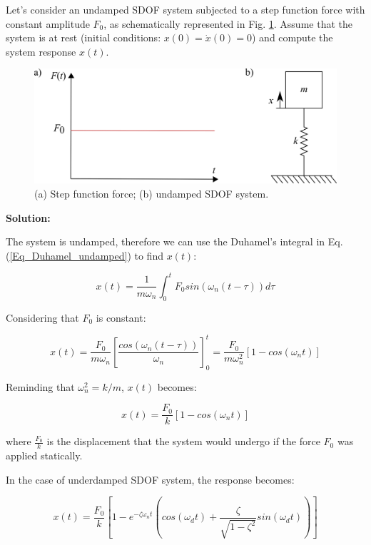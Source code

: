 \documentclass[12pt,letter]{article}
\begin{document}
\begin{example}
	
	Let's consider an undamped SDOF system subjected to a step function force with constant amplitude $F_0$, as schematically represented in Fig. \ref{fig:step_force}. Assume that the system is at rest (initial conditions: $x(0) = \dot{x}(0) = 0$) and compute the system response $x(t)$. 
	
	\begin{figure}[H]
		\centering
		\includegraphics{../figures/structural_step_function_example.png}
		\caption{(a) Step function force; (b) undamped SDOF system.}
		\label{fig:step_force}
	\end{figure} 

\noindent \textbf{Solution:} 
	
The system is undamped, therefore we can use the Duhamel's integral in Eq. (\ref{Eq_Duhamel_undamped}) to find $x(t)$:

\begin{equation} 
x(t) = \frac{1}{m \omega_n} \int_{0}^{t} F_0 sin(\omega_n (t - \tau)) d\tau 
\end{equation}

Considering that $F_0$ is constant:

\begin{equation}
x(t) = \frac{F_0}{m \omega_n} \left [\frac{cos(\omega_n (t - \tau))}{\omega_n} \right ]_{0}^t = \frac{F_0}{m \omega_n^2} [1 - cos(\omega_n t)]
\end{equation}

Reminding that $\omega_n^2 = k/m$, $x(t)$ becomes:

\begin{equation}
x(t) = \frac{F_0}{k} [1 - cos(\omega_n t)]
\end{equation}

where $\frac{F_0}{k}$ is the displacement that the system would undergo if the force $F_0$ was applied statically.

In the case of underdamped SDOF system, the response becomes:

\begin{equation} 
x(t) = \frac{F_0}{k} \left [1 - e^{-\zeta \omega_n t} \left (cos(\omega_d t) + \frac{\zeta}{\sqrt{1 - \zeta^2}} sin(\omega_d t)\right) \right]
\end{equation}

\end{example}
\end{document}
